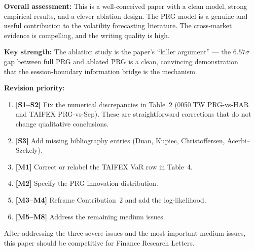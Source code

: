 \documentclass[12pt,a4paper]{article}
\begin{document}
\textbf{Overall assessment:} This is a well-conceived paper with a clean model, strong empirical results, and a clever ablation design. The PRG model is a genuine and useful contribution to the volatility forecasting literature. The cross-market evidence is compelling, and the writing quality is high.

\textbf{Key strength:} The ablation study is the paper's ``killer argument'' --- the $6.57\sigma$ gap between full PRG and ablated PRG is a clean, convincing demonstration that the session-boundary information bridge is the mechanism.

\textbf{Revision priority:}
\begin{enumerate}
\item \textbf{[S1--S2]} Fix the numerical discrepancies in Table~2 (0050.TW PRG-vs-HAR and TAIFEX PRG-vs-Sep). These are straightforward corrections that do not change qualitative conclusions.
\item \textbf{[S3]} Add missing bibliography entries (Duan, Kupiec, Christoffersen, Acerbi--Szekely).
\item \textbf{[M1]} Correct or relabel the TAIFEX VaR row in Table~4.
\item \textbf{[M2]} Specify the PRG innovation distribution.
\item \textbf{[M3--M4]} Reframe Contribution~2 and add the log-likelihood.
\item \textbf{[M5--M8]} Address the remaining medium issues.
\end{enumerate}

\noindent
After addressing the three severe issues and the most important medium issues, this paper should be competitive for Finance Research Letters.
\end{document}
